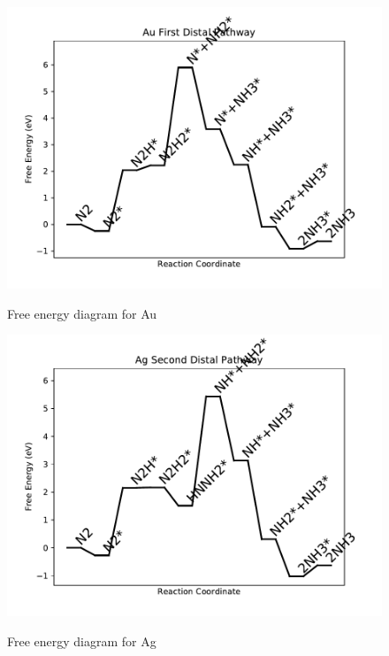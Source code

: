\documentclass[journal=jacsat,manuscript=article]{achemso}
\begin{document}
\begin{figure}
\includegraphics[width=1\linewidth]{data/plots/Au_distal_1.pdf}
\label{fig:Au_distal_1}
\caption{Free energy diagram for Au}
\end{figure}

\newpage
\begin{figure}
\includegraphics[width=1\linewidth]{data/plots/Ag_distal_2.pdf}
\label{fig:Ag_distal_2}
\caption{Free energy diagram for Ag}
\end{figure}
\end{document}
